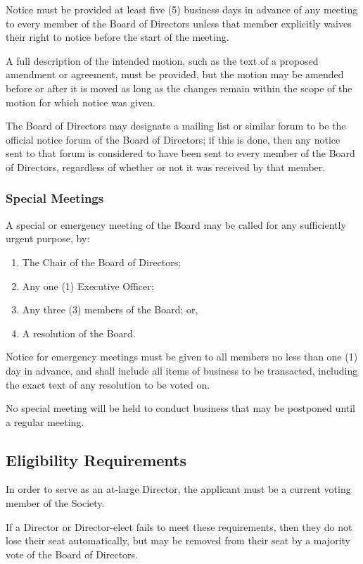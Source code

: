 Notice must be provided at least five (5) business days in advance of any
meeting to every member of the Board of Directors unless that member explicitly
waives their right to notice before the start of the meeting.

A full description of the intended motion, such as the text of a
proposed amendment or agreement, must be provided, but the motion may be
amended before or after it is moved as long as the changes remain within the
scope of the motion for which notice was given.

The Board of Directors may designate a mailing list or similar forum to be the
official notice forum of the Board of Directors; if this is done, then any
notice sent to that forum is considered to have been sent to every member of 
the Board of Directors, regardless of whether or not it was received by that
member.

\subsubsection{Special Meetings}
A special or emergency meeting of the Board may be called for any sufficiently
urgent purpose, by:
\begin{enumerate}
    \item The Chair of the Board of Directors; 
    \item Any one (1) Executive Officer;
    \item Any three (3) members of the Board; or,
    \item A resolution of the Board.
\end{enumerate}

Notice for emergency meetings must be given to all members no less than one
(1) day in advance, and shall include all items of business to be transacted,
including the exact text of any resolution to be voted on.

No special meeting will be held to conduct business that may be postponed until 
a regular meeting.

\subsection{Eligibility Requirements}
In order to serve as an at-large Director, the applicant must be a current voting 
member of the Society.

If a Director or Director-elect fails to meet these requirements, then they
do not lose their seat automatically, but may be removed from their seat by a
majority vote of the Board of Directors.

